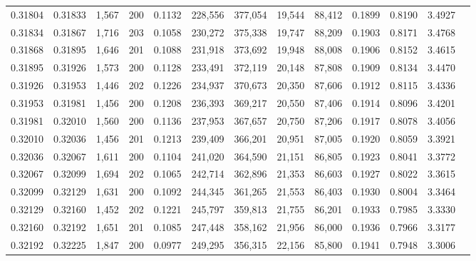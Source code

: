 \begin{tabular}{rrrrrrrrrrrrr}
0.31804 & 0.31833 & 1,567 & 200 &                                     0.1132 & 228,556 & 377,054 &  19,544 &  88,412 & 0.1899 & 0.8190 & 3.4927 \\
0.31834 & 0.31867 & 1,716 & 203 &                                     0.1058 & 230,272 & 375,338 &  19,747 &  88,209 & 0.1903 & 0.8171 & 3.4768 \\
0.31868 & 0.31895 & 1,646 & 201 &                                     0.1088 & 231,918 & 373,692 &  19,948 &  88,008 & 0.1906 & 0.8152 & 3.4615 \\
0.31895 & 0.31926 & 1,573 & 200 &                                     0.1128 & 233,491 & 372,119 &  20,148 &  87,808 & 0.1909 & 0.8134 & 3.4470 \\
0.31926 & 0.31953 & 1,446 & 202 &                                     0.1226 & 234,937 & 370,673 &  20,350 &  87,606 & 0.1912 & 0.8115 & 3.4336 \\
0.31953 & 0.31981 & 1,456 & 200 &                                     0.1208 & 236,393 & 369,217 &  20,550 &  87,406 & 0.1914 & 0.8096 & 3.4201 \\
0.31981 & 0.32010 & 1,560 & 200 &                                     0.1136 & 237,953 & 367,657 &  20,750 &  87,206 & 0.1917 & 0.8078 & 3.4056 \\
0.32010 & 0.32036 & 1,456 & 201 &                                     0.1213 & 239,409 & 366,201 &  20,951 &  87,005 & 0.1920 & 0.8059 & 3.3921 \\
0.32036 & 0.32067 & 1,611 & 200 &                                     0.1104 & 241,020 & 364,590 &  21,151 &  86,805 & 0.1923 & 0.8041 & 3.3772 \\
0.32067 & 0.32099 & 1,694 & 202 &                                     0.1065 & 242,714 & 362,896 &  21,353 &  86,603 & 0.1927 & 0.8022 & 3.3615 \\
0.32099 & 0.32129 & 1,631 & 200 &                                     0.1092 & 244,345 & 361,265 &  21,553 &  86,403 & 0.1930 & 0.8004 & 3.3464 \\
0.32129 & 0.32160 & 1,452 & 202 &                                     0.1221 & 245,797 & 359,813 &  21,755 &  86,201 & 0.1933 & 0.7985 & 3.3330 \\
0.32160 & 0.32192 & 1,651 & 201 &                                     0.1085 & 247,448 & 358,162 &  21,956 &  86,000 & 0.1936 & 0.7966 & 3.3177 \\
0.32192 & 0.32225 & 1,847 & 200 &                                     0.0977 & 249,295 & 356,315 &  22,156 &  85,800 & 0.1941 & 0.7948 & 3.3006 \\

\end{tabular}

